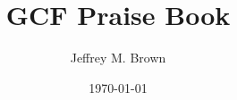\documentclass[11pt, twoside]{article}
\title{GCF Praise Book}
\author{Jeffrey M. Brown}
\date{\today}
\begin{document}
\begin{multicols}{1}
  
\end{multicols}
\end{document}
